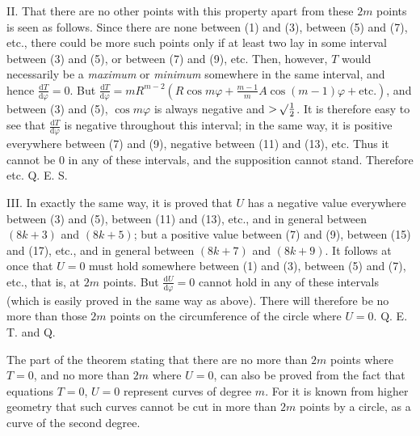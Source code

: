 II. That there are no other points with this property apart from these $2m$ points is seen as follows. Since there are none between (1) and (3), between (5) and (7), etc., there could be more such points only if at least two lay in some interval between (3) and (5), or between (7) and (9), etc. Then, however, $T$ would necessarily be a \textit{maximum} or \textit{minimum} somewhere in the same interval, and hence $\frac{\mathrm dT}{\mathrm d\varphi}=0$. But $\frac{\mathrm dT}{\mathrm d\varphi}=mR^{m-2}(R\cos m\varphi+\frac{m-1}mA\cos(m-1)\varphi+\text{etc.})$, and between (3) and (5), $\cos m\varphi$ is always negative and $>\mathord{{}^{}\!\surd}\frac12$. It is therefore easy to see that $\frac{\mathrm dT}{\mathrm d\varphi}$ is negative throughout this interval; in the same way, it is positive everywhere between (7) and (9), negative between (11) and (13), etc. Thus it cannot be 0 in any of these intervals, and the supposition cannot stand. Therefore etc. Q. E. S.

III. In exactly the same way, it is proved that $U$ has a negative value everywhere between (3) and (5), between (11) and (13), etc., and in general between $(8k+3)$ and $(8k+5)$; but a positive value between (7) and (9), between (15) and (17), etc., and in general between $(8k+7)$ and $(8k+9)$. It follows at once that $U=0$ must hold somewhere between (1) and (3), between (5) and (7), etc., that is, at $2m$ points. But $\frac{\mathrm dU}{\mathrm d\varphi}=0$ cannot hold in any of these intervals (which is easily proved in the same way as above). There will therefore be no more than those $2m$ points on the circumference of the circle where $U=0$. Q. E. T. and Q.

The part of the theorem stating that there are no more than $2m$ points where $T=0$, and no more than $2m$ where $U=0$, can also be proved from the fact that equations $T=0$, $U=0$ represent curves of degree $m$. For it is known from higher geometry that such curves cannot be cut in more than $2m$ points by a circle, as a curve of the second degree.

